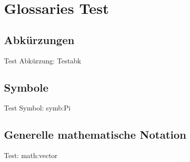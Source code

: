\chapter{Glossaries Test}
\section{Abkürzungen}
Test Abkürzung: \gls{Testabk}
\section{Symbole}
Test Symbol: \gls{symb:Pi}
\section{Generelle mathematische Notation}
Test: \gls{math:vector}

